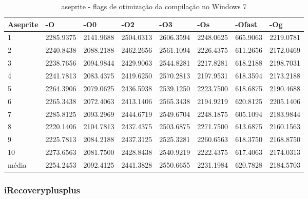 \begin{table}[!ht]
\centering
\caption{aseprite - flags de otimização da compilação no Windows 7}
\label{tab:otimizacao_compilacao:windows:aseprite}
\begin{tabular}{llllllll}
\textbf{Aseprite} & \textbf{-O}  & \textbf{-O0}   & \textbf{-O2} & \textbf{-O3} & \textbf{-Os} & \textbf{-Ofast} & \textbf{-Og} \\ \toprule
1                 &  2285.9375   &  2141.9688     & 2504.0313    &  2606.3594   &  2248.0625   & 665.9063        &  2219.0781   \\ 
2                 &  2240.8438   &  2088.2188     & 2462.2656    &  2561.1094   &  2226.4375   & 611.2656        &  2172.0469   \\ 
3                 &  2238.7656   &  2094.9844     & 2429.9063    &  2544.8281   &  2217.8281   & 618.2188        &  2198.7031   \\ 
4                 &  2241.7813   &  2083.4375     & 2419.6250    &  2570.2813   &  2197.9531   & 618.3594        &  2173.2188   \\ 
5                 &  2264.3906   &  2079.0625     & 2436.5938    &  2539.1250   &  2223.7500   & 618.6875        &  2190.4688   \\ 
6                 &  2265.3438   &  2072.4063     & 2413.1406    &  2565.3438   &  2194.9219   & 620.8125        &  2205.1406   \\ 
7                 &  2285.8125   &  2093.2969     & 2444.6719    &  2549.6704   &  2248.1875   & 605.1094        &  2183.9844   \\ 
8                 &  2220.1406   &  2104.7813     & 2437.4375    &  2503.6875   &  2271.7500   & 613.6875        &  2160.1563   \\ 
9                 &  2225.7813   &  2084.2188     & 2437.3125    &  2525.3281   &  2260.6563   & 618.3750        &  2168.8750   \\ 
10                &  2273.6563   &  2081.7500     & 2428.8438    &  2540.9219   &  2222.4375   & 617.4063        &  2174.0313   \\ \bottomrule
média             &  2254.2453   &  2092.4125     & 2441.3828    &  2550.6655   &  2231.1984   & 620.7828        &  2184.5703   \\ 
\end{tabular}
\end{table}

\clearpage
\subsubsection*{iRecoveryplusplus}


